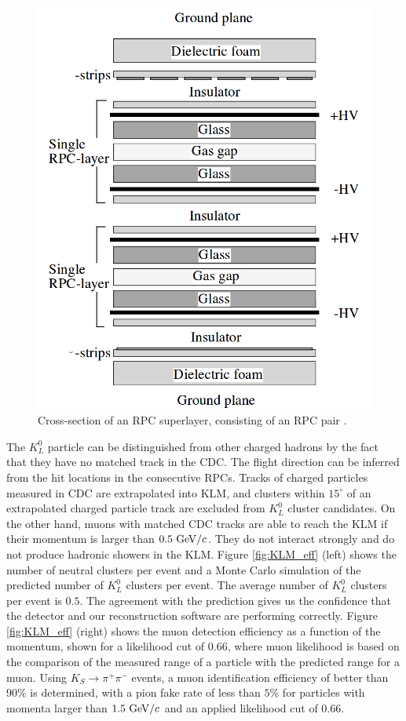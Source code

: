 \begin{figure}[H]
	\centering
	\captionsetup{width=0.8\linewidth}
	\includegraphics[width=0.5\linewidth]{fig/setup/KLM_layer}
	\caption{Cross-section of an RPC superlayer, consisting of an RPC pair \cite{ABASHIAN2002117}.}
	\label{fig:KLM_layer}
\end{figure}

The $K_L^0$ particle can be distinguished from other charged hadrons by the fact that they have no matched track in the CDC. The flight direction can be inferred from the hit locations in the consecutive RPCs. Tracks of charged particles measured in CDC are extrapolated into KLM, and clusters within $15^\circ$ of an extrapolated charged particle track are excluded from $K_L^0$ cluster candidates. On the other hand, muons with matched CDC tracks are able to reach the KLM if their momentum is larger than $0.5\mathrm{~GeV}/c$. They do not interact strongly and do not produce hadronic showers in the KLM. Figure \ref{fig:KLM_eff} (left) shows the number of neutral clusters per event and a Monte Carlo simulation of the predicted number of $K_L^0$ clusters per event. The average number of $K_L^0$ clusters per event is $0.5$. The agreement with the prediction gives us the confidence that the detector and our reconstruction software are performing correctly. Figure \ref{fig:KLM_eff} (right) shows the muon detection efficiency as a function of the momentum, shown for a likelihood cut of $0.66$, where muon likelihood is based on the comparison of the measured range of a particle with the predicted range for a muon. Using $K_S \to \pi^+\pi^-$ events, a muon identification efficiency of better than $90\%$ is determined, with a pion fake rate of less than $5\%$ for particles with momenta larger than $1.5\mathrm{~GeV}/c$ and an applied likelihood cut of $0.66$.

